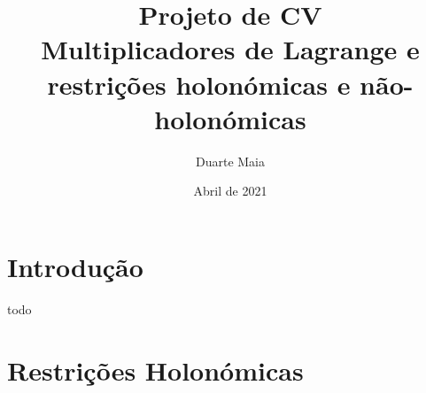 \documentclass{article}
\title{Projeto de CV\\
\large Multiplicadores de Lagrange e restrições holonómicas e não-holonómicas}
\author{Duarte Maia}
\date{Abril de 2021}
\theoremstyle{nonumberplain}
\begin{document}
	\maketitle

	\section{Introdução}

	todo

	\section{Restrições Holonómicas}

	
\end{document}
